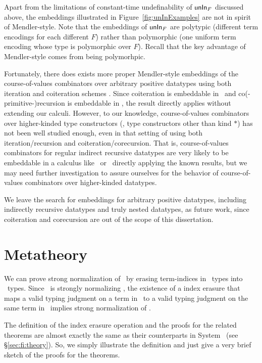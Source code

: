 Apart from the limitations of constant-time undefinability of $\mathsf{unIn}_F$
discussed above, the embeddings illustrated in Figure~\ref{fig:unInExamples}
are not in spirit of Mendler-style. Note that the embeddings of $\mathsf{unIn}_F$ are
polytypic (different term encodings for each different $F$) rather than
polymorphic (one uniform term encoding whose type is polymorphic over $F$).
Recall that the key advantage of Mendler-style comes from being polymorhpic.

Fortunately, there does exists more proper Mendler-style embeddings
of the course-of-values combinators over arbitrary positive datatypes
using both iteration and coiteration schemes \cite{TODO}. Since coiteration
is embeddable in \Fi\ and co(-primitive-)recursion is embeddable in \Fixi,
the result directly applies without extending our calculi. However,
to our knowledge, course-of-values combinators over higher-kinded
type constructors (\ie, type constructors other than kind $*$) has not been
well studied enough, even in that setting of using both iteration/recursion
and coiteration/corecursion. That is, course-of-values combinators for
regular indirect recursive datatypes are very likely to be embeddable in
a calculus like \Fi\ or \Fixi\ directly applying the known results, but
we may need further investigation to assure ourselves for the behavior of
course-of-values combinators over higher-kinded datatypes.

We leave the search for embeddings for arbitrary positive datatypes,
including indirectly recursive datatypes and truly nested datatypes,
as future work, since coiteration and corecursion are out of the scope of
this dissertation.



\section{Metatheory} \label{sec:fixi:theory}

We can prove strong normalization of \Fixi\ by erasing term-indices in \Fixi\ 
types into \Fixw\ types. Since \Fixw\ is strongly normalizing \cite{AbeMat04},
the existence of a index erasure that maps a valid typing judgment on a term
in \Fixi\ to a valid typing judgment on the same term in \Fixw\ implies
strong normalization of \Fixi.

The definition of the index erasure operation and the proofs for
the related theorems are almost exactly the same as their counterparts
in System \Fi\ (see \S\ref{sec:fi:theory}). So, we simply illustrate
the definition and just give a very brief sketch of the proofs for the
theorems.

